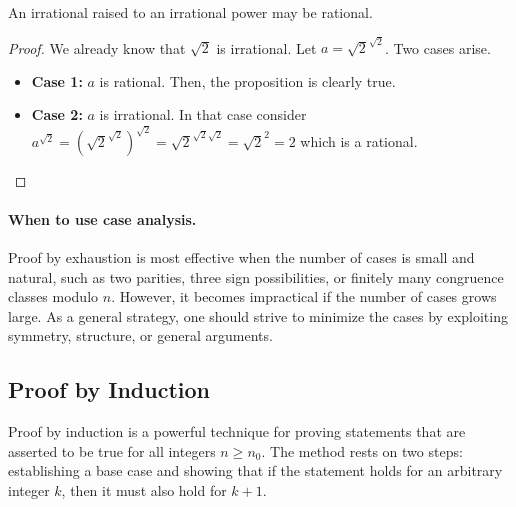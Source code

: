 \begin{theorem}
An irrational raised to an irrational power may be rational.
\end{theorem}
\begin{proof}
We already know that $\sqrt{2}$ is irrational. Let $a = \sqrt{2}^{\sqrt{2}}$.  Two cases arise.
\begin{itemize}
\item \textbf{Case 1:}  $a$ is rational. Then, the proposition is clearly true.
\item \textbf{Case 2:} $a$ is irrational. In that case consider $ a^{\sqrt{2}} =  (\sqrt{2}^{\sqrt{2}})^{\sqrt{2}}  = \sqrt{2}^{\sqrt{2} \sqrt{2}} = \sqrt{2}^2 = 2$ which is a rational.
\end{itemize}
\end{proof}

\paragraph{When to use case analysis.}
Proof by exhaustion is most effective when the number of cases is small and
natural, such as two parities, three sign possibilities, or finitely many
congruence classes modulo $n$. However, it becomes impractical if the number of
cases grows large. As a general strategy, one should strive to minimize the
cases by exploiting symmetry, structure, or general arguments.


\subsection{Proof by Induction}

Proof by induction is a powerful technique for proving statements that are 
asserted to be true for all integers $n \geq n_0$. The method rests on two 
steps: establishing a base case and showing that if the statement holds for 
an arbitrary integer $k$, then it must also hold for $k+1$. 

